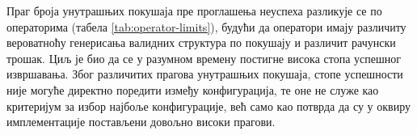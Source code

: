 \documentclass[12pt,oneside]{memoir}
\begin{document}
\begin{table}[!ht]
  \centering
  \small
  \setlength{\tabcolsep}{5pt}
  \renewcommand{\arraystretch}{1.15}
  \caption{Резултати поређења генетских оператора}
  \label{tab:operator-results}
\end{table}

Праг броја унутрашњих покушаја пре проглашења неуспеха разликује 
се по операторима (табела \ref{tab:operator-limits}), будући да 
оператори имају различиту вероватноћу генерисања валидних 
структура по покушају и различит рачунски трошак. Циљ је био да се 
у разумном времену постигне висока стопа успешног извршавања.
Због различитих прагова унутрашњих покушаја, стопе успешности није 
могуће директно поредити између конфигурација, те оне не служе као 
критеријум за избор најбоље конфигурације, већ само као потврда 
да су у оквиру имплементације постављени довољно високи прагови.
\end{document}
